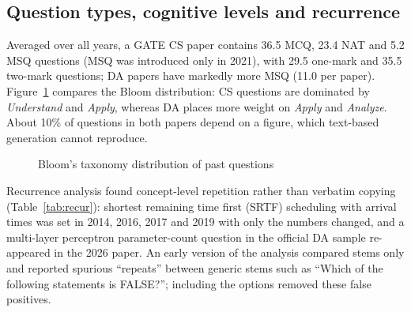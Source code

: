 \subsection{Question types, cognitive levels and recurrence}
Averaged over all years, a GATE CS paper contains 36.5 MCQ, 23.4 NAT and 5.2 MSQ questions (MSQ was introduced only
in 2021), with 29.5 one-mark and 35.5 two-mark questions; DA papers have markedly more MSQ (11.0 per paper).
Figure~\ref{fig:bloom} compares the Bloom distribution: CS questions are dominated by \emph{Understand} and \emph{Apply},
whereas DA places more weight on \emph{Apply} and \emph{Analyze}. About 10\% of questions in both papers depend on a
figure, which text-based generation cannot reproduce.

\begin{figure}[h]
\centering
{}
\caption{Bloom's taxonomy distribution of past questions}
\label{fig:bloom}
\end{figure}

Recurrence analysis found concept-level repetition rather than verbatim copying (Table~\ref{tab:recur}): shortest
remaining time first (SRTF) scheduling with arrival times was set in 2014, 2016, 2017 and 2019 with only the numbers
changed, and a multi-layer perceptron parameter-count question in the official DA sample re-appeared in the 2026 paper.
An early version of the analysis compared stems only and reported spurious ``repeats'' between generic stems such as
``Which of the following statements is FALSE?''; including the options removed these false positives.

